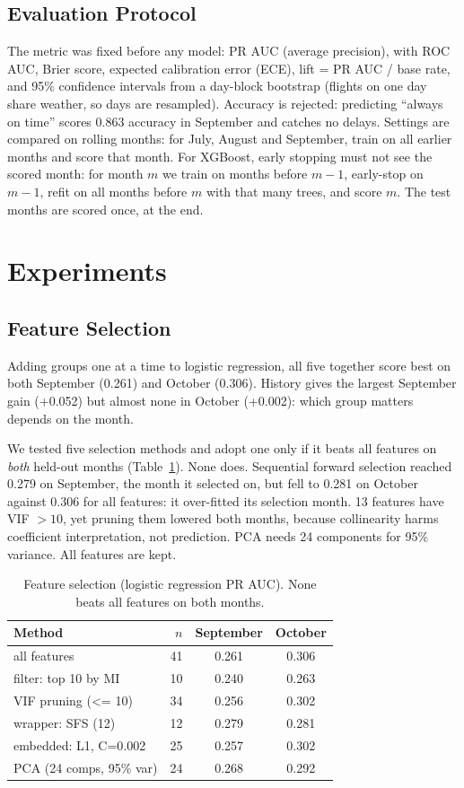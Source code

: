 \documentclass[conference]{IEEEtran}
\begin{document}
\subsection{Evaluation Protocol}
The metric was fixed before any model: PR AUC (average precision), with ROC AUC, Brier score, expected calibration error (ECE), lift = PR AUC / base rate, and 95\% confidence intervals from a day-block bootstrap (flights on one day share weather, so days are resampled). Accuracy is rejected: predicting ``always on time'' scores 0.863 accuracy in September and catches no delays. Settings are compared on rolling months: for July, August and September, train on all earlier months and score that month. For XGBoost, early stopping must not see the scored month: for month $m$ we train on months before $m-1$, early-stop on $m-1$, refit on all months before $m$ with that many trees, and score $m$. The test months are scored once, at the end.

\section{Experiments}
\subsection{Feature Selection}
Adding groups one at a time to logistic regression, all five together score best on both September (0.261) and October (0.306). History gives the largest September gain (+0.052) but almost none in October (+0.002): which group matters depends on the month.

We tested five selection methods and adopt one only if it beats all features on \emph{both} held-out months (Table~\ref{tab:sel}). None does. Sequential forward selection reached 0.279 on September, the month it selected on, but fell to 0.281 on October against 0.306 for all features: it over-fitted its selection month. 13 features have VIF $>10$, yet pruning them lowered both months, because collinearity harms coefficient interpretation, not prediction. PCA needs 24 components for 95\% variance. All features are kept.

\begin{table}[t]\centering\caption{Feature selection (logistic regression PR AUC). None beats all features on both months.}\label{tab:sel}
\footnotesize\begin{tabular}{lrcc}\toprule
Method & $n$ & September & October\\\midrule
all features & 41 & 0.261 & 0.306\\
filter: top 10 by MI & 10 & 0.240 & 0.263\\
VIF pruning (<= 10) & 34 & 0.256 & 0.302\\
wrapper: SFS (12) & 12 & 0.279 & 0.281\\
embedded: L1, C=0.002 & 25 & 0.257 & 0.302\\
PCA (24 comps, 95\% var) & 24 & 0.268 & 0.292\\
\bottomrule\end{tabular}\end{table}
\end{document}
